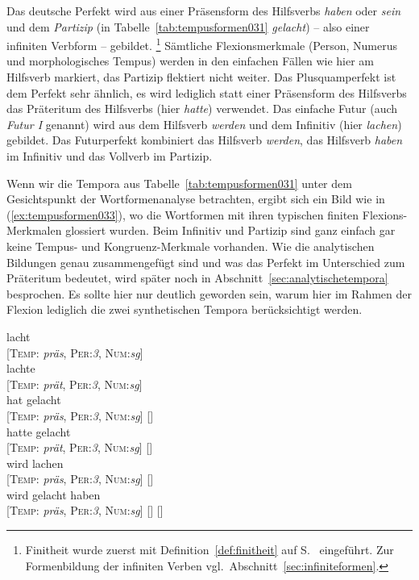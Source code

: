 Das deutsche Perfekt wird aus einer Präsensform des Hilfsverbs \textit{haben} oder \textit{sein} und dem \textit{Partizip} (in Tabelle~\ref{tab:tempusformen031} \textit{gelacht}) -- also einer infiniten Verbform -- gebildet.%
\footnote{Finitheit wurde zuerst mit Definition~\ref{def:finitheit} auf S.~\pageref{def:finitheit} eingeführt.
Zur Formenbildung der infiniten Verben vgl.\ Abschnitt~\ref{sec:infiniteformen}.}
Sämtliche Flexionsmerkmale (Person, Numerus und morphologisches Tempus) werden in den einfachen Fällen wie hier am Hilfsverb markiert, das Partizip flektiert nicht weiter.
Das Plusquamperfekt ist dem Perfekt sehr ähnlich, es wird lediglich statt einer Präsensform des Hilfsverbs das Präteritum des Hilfsverbs (hier \textit{hatte}) verwendet.
Das einfache Futur (auch \textit{Futur I} genannt) wird aus dem Hilfsverb \textit{werden} und dem Infinitiv (hier \textit{lachen}) gebildet.
Das Futurperfekt kombiniert das Hilfsverb \textit{werden}, das Hilfsverb \textit{haben} im Infinitiv und das Vollverb im Partizip.

Wenn wir die Tempora aus Tabelle~\ref{tab:tempusformen031} unter dem Gesichtspunkt der Wortformenanalyse betrachten, ergibt sich ein Bild wie in (\ref{ex:tempusformen033}), wo die Wortformen mit ihren typischen finiten Flexions-Merkmalen glossiert wurden.
Beim Infinitiv und Partizip sind ganz einfach gar keine Tempus- und Kongruenz-Merkmale vorhanden.
Wie die analytischen Bildungen genau zusammengefügt sind und was \zB das Perfekt im Unterschied zum Präteritum bedeutet, wird später noch in Abschnitt~\ref{sec:analytischetempora} besprochen.
Es sollte hier nur deutlich geworden sein, warum hier im Rahmen der Flexion lediglich die zwei synthetischen Tempora berücksichtigt werden.

\begin{exe}
  \ex\label{ex:tempusformen033}
  \begin{xlist}
    \ex\gll lacht \\
    {[\textsc{Temp}: \textit{präs}, \textsc{Per}:\textit{3}, \textsc{Num}:\textit{sg}]}\\
    \ex\gll lachte \\
    {[\textsc{Temp}: \textit{prät}, \textsc{Per}:\textit{3}, \textsc{Num}:\textit{sg}]}\\
    \ex\gll hat gelacht\\
    {[\textsc{Temp}: \textit{präs}, \textsc{Per}:\textit{3}, \textsc{Num}:\textit{sg}]} {[]}\\
    \ex\gll hatte gelacht\\
    {[\textsc{Temp}: \textit{prät}, \textsc{Per}:\textit{3}, \textsc{Num}:\textit{sg}]} {[]}\\
    \ex\gll wird lachen\\
    {[\textsc{Temp}: \textit{präs}, \textsc{Per}:\textit{3}, \textsc{Num}:\textit{sg}]} {[]}\\
    \ex\gll wird gelacht haben \\
    {[\textsc{Temp}: \textit{präs}, \textsc{Per}:\textit{3}, \textsc{Num}:\textit{sg}]} {[]} {[]}\\
  \end{xlist}
\end{exe}


